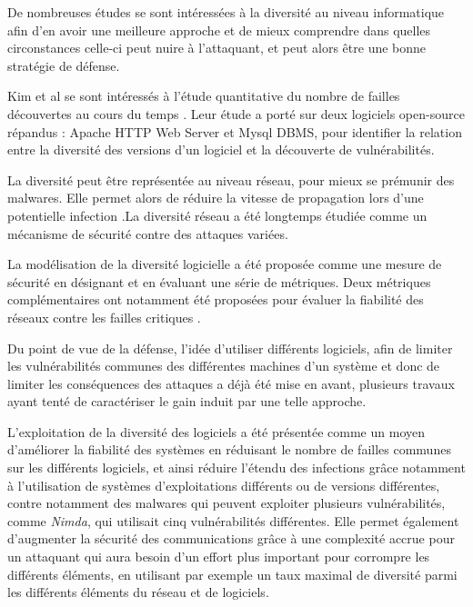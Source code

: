 De nombreuses études se sont intéressées à la diversité au niveau informatique afin d'en avoir une meilleure approche et de mieux comprendre dans quelles circonstances celle-ci peut nuire à l’attaquant, et peut alors être une bonne stratégie de défense.

Kim et al se sont intéressés à l’étude quantitative du nombre de failles découvertes au cours du temps \cite{vulnerabilityDiscovery}. Leur étude a porté sur deux logiciels open-source répandus : Apache HTTP Web Server et Mysql DBMS, pour identifier la relation entre la diversité des versions d’un logiciel et la découverte de vulnérabilités.

La diversité peut être représentée au niveau réseau, pour mieux se prémunir des malwares. Elle permet alors de réduire la vitesse de propagation lors d’une potentielle infection \cite{OptimisingNetwork}.La diversité réseau a été longtemps étudiée comme un mécanisme de sécurité contre des attaques variées.

La modélisation de la diversité logicielle a été proposée comme une mesure de sécurité en désignant et en évaluant une série de métriques. Deux métriques complémentaires ont notamment été proposées pour évaluer la fiabilité des réseaux contre les failles critiques \cite{networkDiversity}.

Du point de vue de la défense, l'idée d'utiliser différents logiciels, afin de limiter les vulnérabilités communes des différentes machines d’un système et donc de limiter les conséquences des attaques a déjà été mise en avant, plusieurs travaux ayant tenté de caractériser le gain induit par une telle approche\cite{softwareDiversity:Security}.

L'exploitation de la diversité des logiciels a été présentée comme un moyen d'améliorer la fiabilité des systèmes en réduisant le nombre de failles communes sur les différents logiciels, et ainsi réduire l’étendu des infections grâce notamment à l’utilisation de systèmes d'exploitations différents ou de versions différentes,\cite{softwareDiversityPracticalStatistics}
contre notamment des malwares qui peuvent exploiter plusieurs vulnérabilités, comme \textit{Nimda}, qui utilisait cinq vulnérabilités différentes. 
Elle permet également d'augmenter la sécurité des communications grâce à une complexité accrue pour un attaquant qui aura besoin d’un effort plus important pour corrompre les différents éléments, en utilisant par exemple un taux maximal de diversité\cite{maximalRatio} parmi les différents éléments du réseau et de logiciels. 

